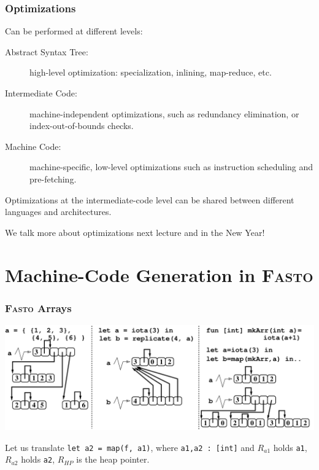 \documentclass{beamer}
\renewcommand{\emph}[1]{\textcolor{structure}{#1}}
\newcommand{\emp}[1]{\textcolor{DikuRed}{ #1}}
\begin{document}
\begin{frame}
\frametitle{Optimizations}

Can be performed at different levels:\smallskip

\begin{description}
\item[Abstract Syntax Tree:] high-level optimization: specialization, 
                inlining, map-reduce, etc.\smallskip


\item[Intermediate Code:] machine-independent optimizations, such as
                redundancy elimination, or index-out-of-bounds checks.\smallskip

\item[Machine Code:] machine-specific, low-level optimizations such as
                        instruction scheduling and pre-fetching.

\end{description}

\bigskip

Optimizations at the intermediate-code level can be shared between
different languages and architectures.

\bigskip

\vspace{1ex}

We talk more about optimizations next lecture and in the New Year!

\end{frame}


\section{Machine-Code Generation in \textsc{Fasto}}

\begin{frame}[fragile]
	\tableofcontents[currentsection]
\end{frame}



\begin{frame}[fragile,t]
   \frametitle{\textsc{Fasto} Arrays}

\bigskip

\includegraphics[width=70ex]{Figures/ArraysPrecise}

\bigskip

Let us translate \emp{\tt let a2 = map(f, a1)}, where \emp{\tt a1,a2~:~[int]}
and \emph{$R_{a1}$} holds \emp{\tt a1}, \emph{$R_{a2}$} holds \emp{\tt a2}, 
\emph{$R_{HP}$} is the heap pointer.

\end{frame}
\end{document}
